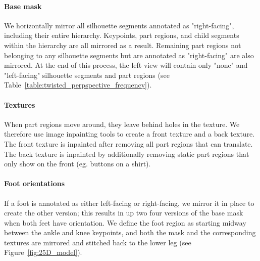 \paragraph{Base mask}
We horizontally mirror all silhouette segments annotated as "right-facing", including their entire hierarchy. Keypoints, part regions, and child segments within the hierarchy are all mirrored as a result. Remaining part regions not belonging to any silhouette segments but are annotated as "right-facing" are also mirrored. At the end of this process, the left view will contain only "none" and "left-facing" silhouette segments and part regions (see Table~\ref{table:twisted_perpspective_frequency}).

\paragraph{Textures} When part regions move around, they leave behind holes in the texture. We therefore use image inpainting tools \cite{} to create a front texture and a back texture. The front texture is inpainted after removing all part regions that can translate. The back texture is inpainted by additionally removing static part regions that only show on the front (eg. buttons on a shirt).

\begin{comment}
We begin constructing the full 2.5D character model by first creating distinct left and right-facing version of the figure, which we refer to as the \textit{left half} and \textit{right half}. \yuting{do we need to explain why we don't need front/back-facing versions?}
To create the left half, we first inspect each silhouette segment and horizontally mirror any with right-facing orientations. 
Keypoints and part regions with the silhouette segment, as well as distal silhouette segments, are also mirrored during this operation.
We next inspect each part region, again mirroring any with right-facing orientations.
At the end of this process, the left half will contain only forward facing and left-facing silhouette segments and part regions ( see Table~\ref{table:twisted_perpspective_frequency}).
The Right Half is created similarly.
\end{comment}

\paragraph{Foot orientations} If a foot is annotated as either left-facing or right-facing, we mirror it in place to create the other version; this results in up two four versions of the base mask when both feet have orientation. We define the foot region as starting midway between the ankle and knee keypoints, and both the mask and the corresponding textures are mirrored and stitched back to the lower leg (see Figure~\ref{fig:25D_model}).

